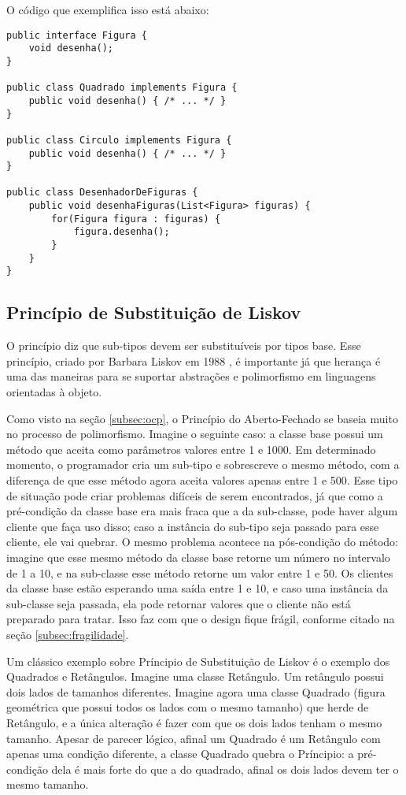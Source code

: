 O código que exemplifica isso está abaixo:

\begin{lstlisting}[frame=trbl]
public interface Figura {
	void desenha();
}

public class Quadrado implements Figura {
	public void desenha() { /* ... */ }
}

public class Circulo implements Figura {
	public void desenha() { /* ... */ }
}

public class DesenhadorDeFiguras {
	public void desenhaFiguras(List<Figura> figuras) {
		for(Figura figura : figuras) {
			figura.desenha();
		}
	}
}
\end{lstlisting}

\subsection{Princípio de Substituição de Liskov}
\label{subsec:lsp}

O princípio diz que sub-tipos devem ser substituíveis por tipos base. Esse princípio, criado por Barbara Liskov em 1988 \cite{liskov},
é importante já que herança é uma das maneiras para se suportar abstrações e polimorfismo em linguagens orientadas à objeto.

Como visto na seção \ref{subsec:ocp}, o Princípio do Aberto-Fechado se baseia muito no processo de polimorfismo. Imagine o seguinte caso:
a classe base possui um método que aceita como parâmetros valores entre 1 e 1000. Em determinado momento, o programador cria um sub-tipo
e sobrescreve o mesmo método, com a diferença de que esse método agora aceita valores apenas entre 1 e 500. Esse tipo de situação pode
criar problemas difíceis de serem encontrados, já que como a pré-condição da classe base era mais fraca que a da sub-classe, pode haver
algum cliente que faça uso disso; caso a instância do sub-tipo seja passado para esse cliente, ele vai quebrar. O mesmo problema
acontece na pós-condição do método: imagine que esse mesmo método da classe base retorne um número no intervalo de 1 a 10, e na sub-classe
esse método retorne um valor entre 1 e 50. Os clientes da classe base estão esperando uma saída entre 1 e 10, e caso uma instância da
sub-classe seja passada, ela pode retornar valores que o cliente não está preparado para tratar. Isso faz com que o design fique frágil, 
conforme citado na seção \ref{subsec:fragilidade}.  

Um clássico exemplo sobre Príncipio de Substituição de Liskov é o exemplo dos Quadrados e Retângulos. Imagine uma classe Retângulo. Um
retângulo possui dois lados de tamanhos diferentes. Imagine agora uma classe Quadrado (figura geométrica que possui todos os lados
com o mesmo tamanho) que herde de Retângulo, e a única alteração é fazer com que os dois lados tenham o mesmo tamanho. Apesar
de parecer lógico, afinal um Quadrado é um Retângulo com apenas uma condição diferente, a classe Quadrado quebra o Príncipio:
a pré-condição dela é mais forte do que a do quadrado, afinal os dois lados devem ter o mesmo tamanho. 

